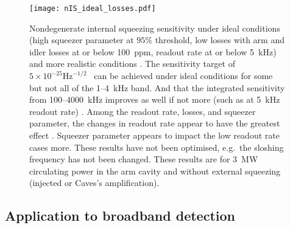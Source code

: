 \begin{figure}
	\centering
	\texttt{[image: nIS\_ideal\_losses.pdf]}
	\caption{  Nondegenerate internal squeezing sensitivity under ideal conditions (high squeezer parameter at $95\%$ threshold, low losses with arm and idler losses at or below 100~ppm, readout rate at or below 5~kHz) and more realistic conditions . The sensitivity target of $5\times10^{-25}\text{Hz}^{-1/2}$~\cite{Miao2018} can be achieved under ideal conditions for some but not all of the 1--4~kHz band. And that the integrated sensitivity from 100--4000~kHz improves as well if not more (such as at 5~kHz readout rate) . Among the readout rate, losses, and squeezer parameter, the changes in readout rate appear to have the greatest effect . Squeezer parameter appears to impact the low readout rate cases more. These results have not been optimised, e.g.\ the sloshing frequency has not been changed. These results are for 3~MW circulating power in the arm cavity and without external squeezing (injected or Caves's amplification).}
	\label{fig:nIS_sens_target}
\end{figure}







\subsection{Application to broadband detection}


